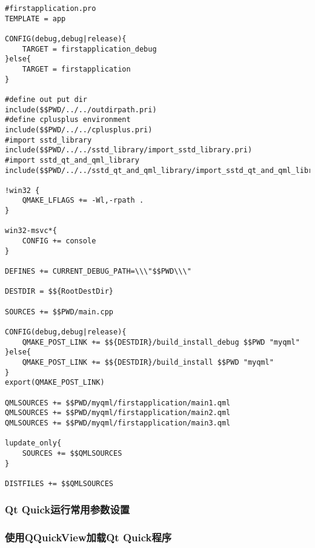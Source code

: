 \begin{lstlisting}[label=f000019,
caption=GoodLuck,
title=\lstlistingname\ \thelstlisting
]
#firstapplication.pro
TEMPLATE = app

CONFIG(debug,debug|release){
    TARGET = firstapplication_debug
}else{
    TARGET = firstapplication
}

#define out put dir
include($$PWD/../../outdirpath.pri)
#define cplusplus environment
include($$PWD/../../cplusplus.pri)
#import sstd_library
include($$PWD/../../sstd_library/import_sstd_library.pri)
#import sstd_qt_and_qml_library
include($$PWD/../../sstd_qt_and_qml_library/import_sstd_qt_and_qml_library.pri)

!win32 {
    QMAKE_LFLAGS += -Wl,-rpath .
}

win32-msvc*{
    CONFIG += console
}

DEFINES += CURRENT_DEBUG_PATH=\\\"$$PWD\\\"

DESTDIR = $${RootDestDir}

SOURCES += $$PWD/main.cpp

CONFIG(debug,debug|release){
    QMAKE_POST_LINK += $${DESTDIR}/build_install_debug $$PWD "myqml"
}else{
    QMAKE_POST_LINK += $${DESTDIR}/build_install $$PWD "myqml"
}
export(QMAKE_POST_LINK)

QMLSOURCES += $$PWD/myqml/firstapplication/main1.qml
QMLSOURCES += $$PWD/myqml/firstapplication/main2.qml
QMLSOURCES += $$PWD/myqml/firstapplication/main3.qml

lupdate_only{
    SOURCES += $$QMLSOURCES
}

DISTFILES += $$QMLSOURCES
\end{lstlisting}          %


\FloatBarrier
\subsubsection{
Qt Quick运行常用参数设置
}\label{ss001v10}


\FloatBarrier
\subsubsection{
使用QQuickView加载Qt Quick程序
}\label{ss001010}

